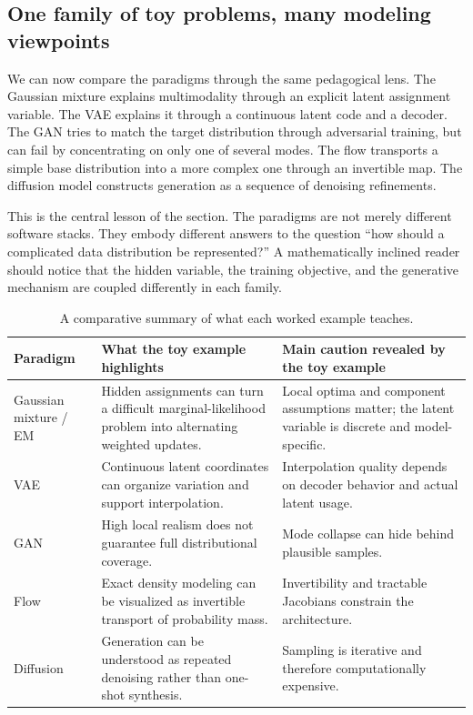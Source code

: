 \subsection*{One family of toy problems, many modeling viewpoints}

We can now compare the paradigms through the same pedagogical lens.
The Gaussian mixture explains multimodality through an explicit latent assignment variable.
The VAE explains it through a continuous latent code and a decoder.
The GAN tries to match the target distribution through adversarial training, but can fail by concentrating on only one of several modes.
The flow transports a simple base distribution into a more complex one through an invertible map.
The diffusion model constructs generation as a sequence of denoising refinements.

This is the central lesson of the section.
The paradigms are not merely different software stacks.
They embody different answers to the question ``how should a complicated data distribution be represented?''
A mathematically inclined reader should notice that the hidden variable, the training objective, and the generative mechanism are coupled differently in each family.

\begin{table}[h]
\centering
\small
\renewcommand{\arraystretch}{1.2}
\begin{tabular}{|p{2.2cm}|p{3.6cm}|p{4.2cm}|}
\hline
\textbf{Paradigm} & \textbf{What the toy example highlights} & \textbf{Main caution revealed by the toy example} \\
\hline
Gaussian mixture / EM & Hidden assignments can turn a difficult marginal-likelihood problem into alternating weighted updates. & Local optima and component assumptions matter; the latent variable is discrete and model-specific. \\
\hline
VAE & Continuous latent coordinates can organize variation and support interpolation. & Interpolation quality depends on decoder behavior and actual latent usage. \\
\hline
GAN & High local realism does not guarantee full distributional coverage. & Mode collapse can hide behind plausible samples. \\
\hline
Flow & Exact density modeling can be visualized as invertible transport of probability mass. & Invertibility and tractable Jacobians constrain the architecture. \\
\hline
Diffusion & Generation can be understood as repeated denoising rather than one-shot synthesis. & Sampling is iterative and therefore computationally expensive. \\
\hline
\end{tabular}
\caption{A comparative summary of what each worked example teaches.}
\label{tab:workedgensummary}
\end{table}

